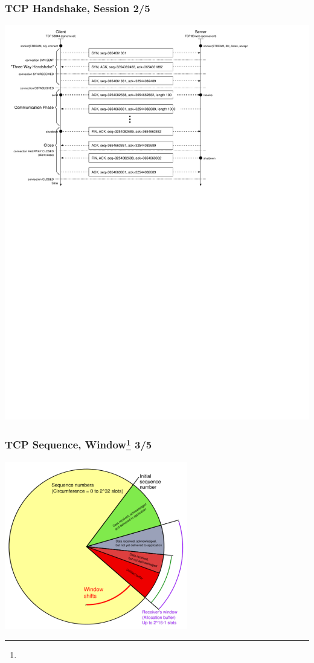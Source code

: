 \documentclass[ignorenonframetext]{beamer}
\begin{document}
\begin{frame}
\frametitle{TCP Handshake, Session 2/5}
\includegraphics[width=15cm]{tcp-handshake}
\end{frame}


\begin{frame}
\frametitle{TCP Sequence, Window\footnote{} 3/5}
\begin{center}
\includegraphics[width=8cm]{tcp-window}
\end{center}
\end{frame}
\end{document}

